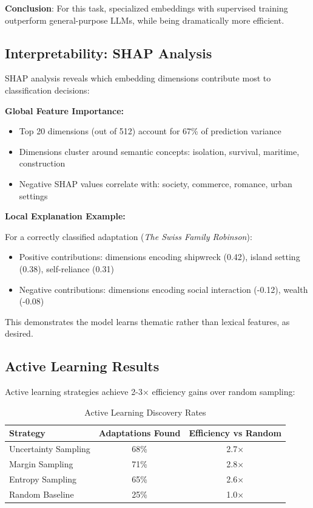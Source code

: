 \documentclass[12pt,a4paper]{article}
\begin{document}
\textbf{Conclusion}: For this task, specialized embeddings with supervised training outperform general-purpose LLMs, while being dramatically more efficient.

\subsection{Interpretability: SHAP Analysis}

SHAP analysis reveals which embedding dimensions contribute most to classification decisions:

\textbf{Global Feature Importance:}
\begin{itemize}
    \item Top 20 dimensions (out of 512) account for 67\% of prediction variance
    \item Dimensions cluster around semantic concepts: isolation, survival, maritime, construction
    \item Negative SHAP values correlate with: society, commerce, romance, urban settings
\end{itemize}

\textbf{Local Explanation Example:}

For a correctly classified adaptation (\textit{The Swiss Family Robinson}):
\begin{itemize}
    \item Positive contributions: dimensions encoding shipwreck (0.42), island setting (0.38), self-reliance (0.31)
    \item Negative contributions: dimensions encoding social interaction (-0.12), wealth (-0.08)
\end{itemize}

This demonstrates the model learns thematic rather than lexical features, as desired.

\subsection{Active Learning Results}

Active learning strategies achieve 2-3× efficiency gains over random sampling:

\begin{table}[h]
\centering
\caption{Active Learning Discovery Rates}
\begin{tabular}{lcc}
\toprule
\textbf{Strategy} & \textbf{Adaptations Found} & \textbf{Efficiency vs Random} \\
\midrule
Uncertainty Sampling & 68\% & 2.7× \\
Margin Sampling & 71\% & 2.8× \\
Entropy Sampling & 65\% & 2.6× \\
Random Baseline & 25\% & 1.0× \\
\bottomrule
\end{tabular}
\end{table}
\end{document}
